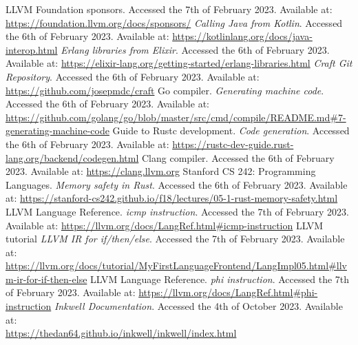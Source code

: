 ﻿\documentclass[10pt,a4paper,twocolumn,twoside]{article}
\begin{document}
\renewcommand\refname{References}
\begin{thebibliography}{11}
 LLVM Foundation sponsors. Accessed the 7th of February 2023. Available at: \url{https://foundation.llvm.org/docs/sponsors/}
 \textit{Calling Java from Kotlin}. Accessed the 6th of February 2023. Available at: \url{https://kotlinlang.org/docs/java-interop.html}
 \textit{Erlang libraries from Elixir}. Accessed the 6th of February 2023. Available at: \url{https://elixir-lang.org/getting-started/erlang-libraries.html}
 \textit{Craft Git Repository}. Accessed the 6th of February 2023. Available at: \\\url{https://github.com/josepmdc/craft}
Go compiler. \textit{Generating machine code}. Accessed the 6th of February 2023. Available at: \url{https://github.com/golang/go/blob/master/src/cmd/compile/README.md#7-generating-machine-code}
 Guide to Rustc development. \textit{Code generation}. Accessed the 6th of February 2023. Available at: \url{https://rustc-dev-guide.rust-lang.org/backend/codegen.html}
 Clang compiler. Accessed the 6th of February 2023. Available at: \url{https://clang.llvm.org}
 Stanford CS 242: Programming Languages. \textit{Memory safety in Rust}. Accessed the 6th of February 2023. Available at: \url{https://stanford-cs242.github.io/f18/lectures/05-1-rust-memory-safety.html}
 LLVM Language Reference. \textit{icmp instruction}. Accessed the 7th of February 2023. Available at: \url{https://llvm.org/docs/LangRef.html#icmp-instruction}
 LLVM tutorial \textit{LLVM IR for if/then/else}. Accessed the 7th of February 2023. Available at: \url{https://llvm.org/docs/tutorial/MyFirstLanguageFrontend/LangImpl05.html#llvm-ir-for-if-then-else}
 LLVM Language Reference. \textit{phi instruction}. Accessed the 7th of February 2023. Available at: \url{https://llvm.org/docs/LangRef.html#phi-instruction}
 \textit{Inkwell Documentation}. Accessed the 4th of October 2023. Available at: \\\url{https://thedan64.github.io/inkwell/inkwell/index.html}
\end{thebibliography}
\end{document}
